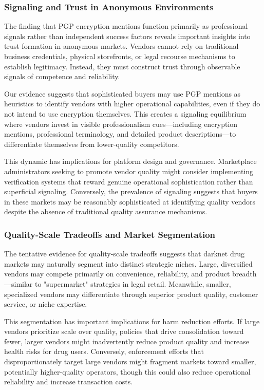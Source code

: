 \documentclass{article}
\begin{document}
\subsubsection{Signaling and Trust in Anonymous Environments}

The finding that PGP encryption mentions function primarily as professional signals rather than independent success factors reveals important insights into trust formation in anonymous markets. Vendors cannot rely on traditional business credentials, physical storefronts, or legal recourse mechanisms to establish legitimacy. Instead, they must construct trust through observable signals of competence and reliability.

Our evidence suggests that sophisticated buyers may use PGP mentions as heuristics to identify vendors with higher operational capabilities, even if they do not intend to use encryption themselves. This creates a signaling equilibrium where vendors invest in visible professionalism cues—including encryption mentions, professional terminology, and detailed product descriptions—to differentiate themselves from lower-quality competitors.

This dynamic has implications for platform design and governance. Marketplace administrators seeking to promote vendor quality might consider implementing verification systems that reward genuine operational sophistication rather than superficial signaling. Conversely, the prevalence of signaling suggests that buyers in these markets may be reasonably sophisticated at identifying quality vendors despite the absence of traditional quality assurance mechanisms.

\subsubsection{Quality-Scale Tradeoffs and Market Segmentation}

The tentative evidence for quality-scale tradeoffs suggests that darknet drug markets may naturally segment into distinct strategic niches. Large, diversified vendors may compete primarily on convenience, reliability, and product breadth—similar to "supermarket" strategies in legal retail. Meanwhile, smaller, specialized vendors may differentiate through superior product quality, customer service, or niche expertise.

This segmentation has important implications for harm reduction efforts. If large vendors prioritize scale over quality, policies that drive consolidation toward fewer, larger vendors might inadvertently reduce product quality and increase health risks for drug users. Conversely, enforcement efforts that disproportionately target large vendors might fragment markets toward smaller, potentially higher-quality operators, though this could also reduce operational reliability and increase transaction costs.
\end{document}
